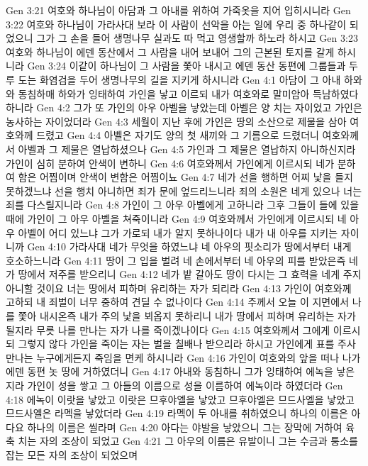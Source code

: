 Gen 3:21  여호와 하나님이 아담과 그 아내를 위하여 가죽옷을 지어 입히시니라
Gen 3:22  여호와 하나님이 가라사대 보라 이 사람이 선악을 아는 일에 우리 중 하나같이 되었으니 그가 그 손을 들어 생명나무 실과도 따 먹고 영생할까 하노라 하시고
Gen 3:23  여호와 하나님이 에덴 동산에서 그 사람을 내어 보내어 그의 근본된 토지를 갈게 하시니라
Gen 3:24  이같이 하나님이 그 사람을 쫓아 내시고 에덴 동산 동편에 그룹들과 두루 도는 화염검을 두어 생명나무의 길을 지키게 하시니라
Gen 4:1  아담이 그 아내 하와와 동침하매 하와가 잉태하여 가인을 낳고 이르되 내가 여호와로 말미암아 득남하였다 하니라
Gen 4:2  그가 또 가인의 아우 아벨을 낳았는데 아벨은 양 치는 자이었고 가인은 농사하는 자이었더라
Gen 4:3  세월이 지난 후에 가인은 땅의 소산으로 제물을 삼아 여호와께 드렸고
Gen 4:4  아벨은 자기도 양의 첫 새끼와 그 기름으로 드렸더니 여호와께서 아벨과 그 제물은 열납하셨으나
Gen 4:5  가인과 그 제물은 열납하지 아니하신지라 가인이 심히 분하여 안색이 변하니
Gen 4:6  여호와께서 가인에게 이르시되 네가 분하여 함은 어찜이며 안색이 변함은 어찜이뇨
Gen 4:7  네가 선을 행하면 어찌 낯을 들지 못하겠느냐 선을 행치 아니하면 죄가 문에 엎드리느니라 죄의 소원은 네게 있으나 너는 죄를 다스릴지니라
Gen 4:8  가인이 그 아우 아벨에게 고하니라 그후 그들이 들에 있을 때에 가인이 그 아우 아벨을 쳐죽이니라
Gen 4:9  여호와께서 가인에게 이르시되 네 아우 아벨이 어디 있느냐 그가 가로되 내가 알지 못하나이다 내가 내 아우를 지키는 자이니까
Gen 4:10  가라사대 네가 무엇을 하였느냐 네 아우의 핏소리가 땅에서부터 내게 호소하느니라
Gen 4:11  땅이 그 입을 벌려 네 손에서부터 네 아우의 피를 받았은즉 네가 땅에서 저주를 받으리니
Gen 4:12  네가 밭 갈아도 땅이 다시는 그 효력을 네게 주지 아니할 것이요 너는 땅에서 피하며 유리하는 자가 되리라
Gen 4:13  가인이 여호와께 고하되 내 죄벌이 너무 중하여 견딜 수 없나이다
Gen 4:14  주께서 오늘 이 지면에서 나를 쫓아 내시온즉 내가 주의 낯을 뵈옵지 못하리니 내가 땅에서 피하며 유리하는 자가 될지라 무릇 나를 만나는 자가 나를 죽이겠나이다
Gen 4:15  여호와께서 그에게 이르시되 그렇지 않다 가인을 죽이는 자는 벌을 칠배나 받으리라 하시고 가인에게 표를 주사 만나는 누구에게든지 죽임을 면케 하시니라
Gen 4:16  가인이 여호와의 앞을 떠나 나가 에덴 동편 놋 땅에 거하였더니
Gen 4:17  아내와 동침하니 그가 잉태하여 에녹을 낳은지라 가인이 성을 쌓고 그 아들의 이름으로 성을 이름하여 에녹이라 하였더라
Gen 4:18  에녹이 이랏을 낳았고 이랏은 므후야엘을 낳았고 므후야엘은 므드사엘을 낳았고 므드사엘은 라멕을 낳았더라
Gen 4:19  라멕이 두 아내를 취하였으니 하나의 이름은 아다요 하나의 이름은 씰라며
Gen 4:20  아다는 야발을 낳았으니 그는 장막에 거하여 육축 치는 자의 조상이 되었고
Gen 4:21  그 아우의 이름은 유발이니 그는 수금과 퉁소를 잡는 모든 자의 조상이 되었으며
